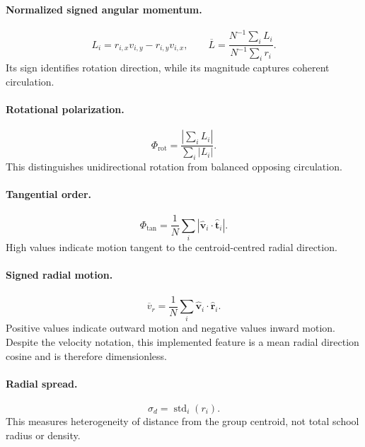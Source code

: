 \documentclass[11pt]{article}
\newcommand{\phirot}{\Phi_{\mathrm{rot}}}
\newcommand{\phitan}{\Phi_{\mathrm{tan}}}
\newcommand{\lbar}{\overline{L}}
\newcommand{\vrbar}{\overline{v}_{r}}
\newcommand{\sigmad}{\sigma_d}
\begin{document}
\paragraph{Normalized signed angular momentum.}
\begin{equation}
 L_i=r_{i,x}v_{i,y}-r_{i,y}v_{i,x},\qquad
 \lbar=\frac{N^{-1}\sum_i L_i}{N^{-1}\sum_i r_i}.
\end{equation}
Its sign identifies rotation direction, while its magnitude captures coherent circulation.

\paragraph{Rotational polarization.}
\begin{equation}
 \phirot=\frac{\left|\sum_i L_i\right|}{\sum_i|L_i|}.
\end{equation}
This distinguishes unidirectional rotation from balanced opposing circulation.

\paragraph{Tangential order.}
\begin{equation}
 \phitan=\frac{1}{N}\sum_i
 \left|\widehat{\bm{v}}_i\cdot\widehat{\bm{t}}_i\right|.
\end{equation}
High values indicate motion tangent to the centroid-centred radial direction.

\paragraph{Signed radial motion.}
\begin{equation}
 \vrbar=\frac{1}{N}\sum_i
 \widehat{\bm{v}}_i\cdot\widehat{\bm{r}}_i.
\end{equation}
Positive values indicate outward motion and negative values inward motion. Despite the velocity notation,
this implemented feature is a mean radial direction cosine and is therefore dimensionless.

\paragraph{Radial spread.}
\begin{equation}
 \sigmad=\operatorname{std}_i(r_i).
\end{equation}
This measures heterogeneity of distance from the group centroid, not total school radius or density.
\end{document}
